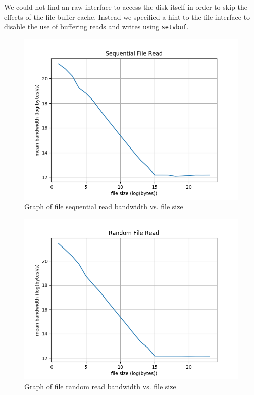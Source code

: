 \documentclass[letterpaper,twocolumn,10pt]{article}
\begin{document}
We could not find an raw interface to access the disk itself in order to skip
the effects of the file buffer cache. Instead we specified a hint to the file
interface to disable the use of buffering reads and writes using
\texttt{setvbuf}.

\begin{figure}
	\centering
	\includegraphics{graphs/file_read_seq}
  \caption{Graph of file sequential read bandwidth vs. file size}
	\label{fig:filecache}
\end{figure}

\begin{figure}
	\centering
	\includegraphics{graphs/file_read_rand}
  \caption{Graph of file random read bandwidth vs. file size}
	\label{fig:filecache}
\end{figure}
\end{document}
